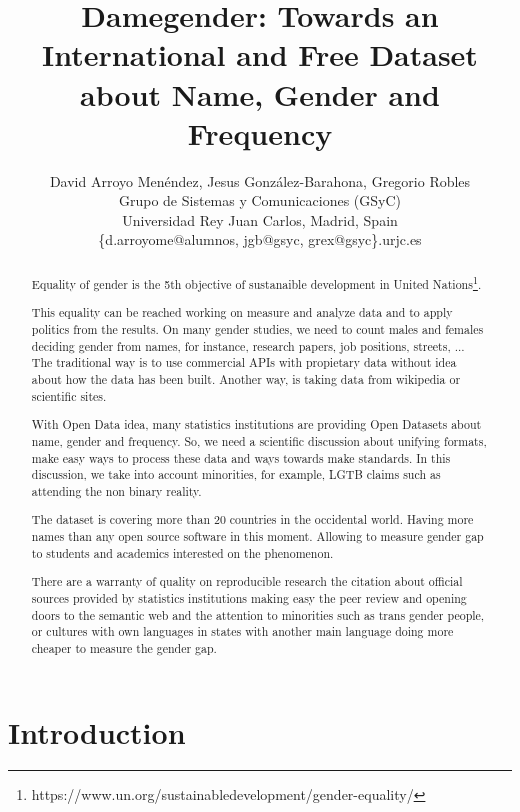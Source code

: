 \documentclass[a4paper]{article}
\title{Damegender: Towards an International and Free Dataset about Name, Gender and Frequency}
\author{
David Arroyo Menéndez, Jesus González-Barahona, Gregorio Robles \\ Grupo de Sistemas y Comunicaciones (GSyC) \\ Universidad Rey Juan Carlos, Madrid, Spain \\ \{d.arroyome@alumnos, jgb@gsyc, grex@gsyc\}.urjc.es
}
\begin{document}
\maketitle

\begin{abstract}

  Equality of gender is the 5th objective of sustanaible development
  in United
  Nations\footnote{https://www.un.org/sustainabledevelopment/gender-equality/}.

  This equality can be reached working on measure and analyze data and
  to apply politics from the results. On many gender studies, we need
  to count males and females deciding gender from names, for instance,
  research papers, job positions, streets, ... The traditional way is
  to use commercial APIs with propietary data without idea about how
  the data has been built. Another way, is taking data from wikipedia
  or scientific sites.


  With Open Data idea, many statistics institutions are providing Open
  Datasets about name, gender and frequency. So, we need a scientific
  discussion about unifying formats, make easy ways to process these
  data and ways towards make standards. In this discussion, we take
  into account minorities, for example, LGTB claims such as attending
  the non binary reality.

  
  The dataset is covering more than 20 countries in the occidental
  world. Having more names than any open source software in this
  moment. Allowing to measure gender gap to students and academics
  interested on the phenomenon.


  There are a warranty of quality on reproducible research the
  citation about official sources provided by statistics institutions
  making easy the peer review and opening doors to the semantic web
  and the attention to minorities such as trans gender people, or
  cultures with own languages in states with another main language
  doing more cheaper to measure the gender gap.
  
\end{abstract}


\section{Introduction}
\end{document}
